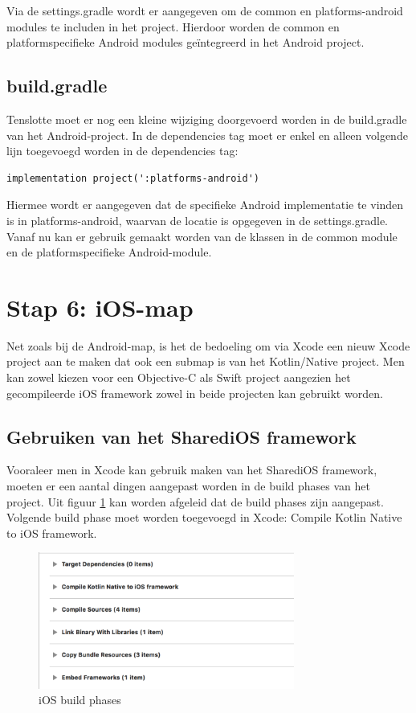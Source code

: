 Via de settings.gradle wordt er aangegeven om de common en platforms-android modules te includen in het project. Hierdoor worden de common en platformspecifieke Android modules geïntegreerd in het Android project.

\subsection{build.gradle}
Tenslotte moet er nog een kleine wijziging doorgevoerd worden in de build.gradle van het Android-project. In de dependencies tag moet er enkel en alleen volgende lijn toegevoegd worden in de dependencies tag:

\begin{lstlisting}
implementation project(':platforms-android')
\end{lstlisting}

Hiermee wordt er aangegeven dat de specifieke Android implementatie te vinden is in platforms-android, waarvan de locatie is opgegeven in de settings.gradle. Vanaf nu kan er gebruik gemaakt worden van de klassen in de common module en de platformspecifieke Android-module.

\section{Stap 6: iOS-map}
\label{sec:ios-stap6}
Net zoals bij de Android-map, is het de bedoeling om via Xcode een nieuw Xcode project aan te maken dat ook een submap is van het Kotlin/Native project. Men kan zowel kiezen voor een Objective-C als Swift project aangezien het gecompileerde iOS framework zowel in beide projecten kan gebruikt worden.

\subsection{Gebruiken van het SharediOS framework}
Vooraleer men in Xcode kan gebruik maken van het SharediOS framework, moeten er een aantal dingen aangepast worden in de build phases van het project. Uit figuur \ref{fig:stap6-phases} kan worden afgeleid dat de build phases zijn aangepast. Volgende build phase moet worden toegevoegd in Xcode: Compile Kotlin Native to iOS framework.
\begin{figure} [ht]
	\centering
	\includegraphics[width=0.75\textwidth]{img/stap6-phases.png}
	\caption{iOS build phases}
	\label{fig:stap6-phases}
\end{figure}

